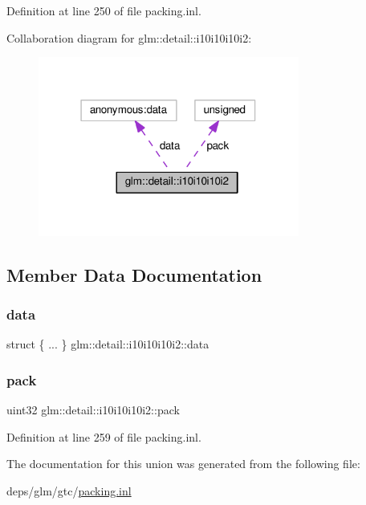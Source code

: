 Definition at line 250 of file packing.\+inl.



Collaboration diagram for glm\+:\+:detail\+:\+:i10i10i10i2\+:
\nopagebreak
\begin{figure}[H]
\begin{center}
\leavevmode
\includegraphics[width=243pt]{dc/d01/unionglm_1_1detail_1_1i10i10i10i2__coll__graph}
\end{center}
\end{figure}


\subsection{Member Data Documentation}
\mbox{\label{unionglm_1_1detail_1_1i10i10i10i2_ab4c1d4602d19f6bdfdf850ff892cd0c7}} 
\subsubsection{\texorpdfstring{data}{data}}
{\footnotesize\ttfamily struct \{ ... \}   glm\+::detail\+::i10i10i10i2\+::data}

\mbox{\label{unionglm_1_1detail_1_1i10i10i10i2_a24e2dc324c86589d568dc330904c859a}} 
\subsubsection{\texorpdfstring{pack}{pack}}
{\footnotesize\ttfamily uint32 glm\+::detail\+::i10i10i10i2\+::pack}



Definition at line 259 of file packing.\+inl.



The documentation for this union was generated from the following file\+:\begin{DoxyCompactItemize}
\item 
deps/glm/gtc/\hyperlink{packing_8inl}{packing.\+inl}\end{DoxyCompactItemize}
